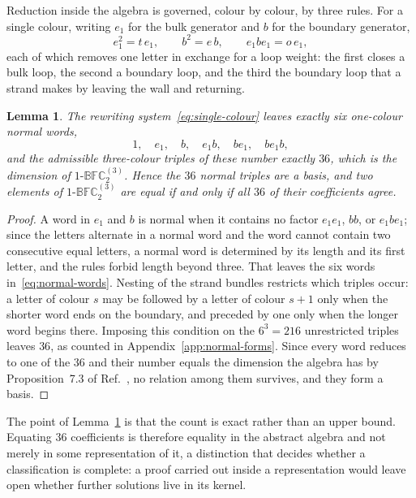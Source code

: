 \documentclass[
  aps,pre,
  reprint,
  superscriptaddress,
  amsmath,amssymb,
  floatfix
]{revtex4-2}
\theoremstyle{plain}
\newtheorem{lemma}[theorem]{Lemma}
\theoremstyle{definition}
\theoremstyle{remark}
\newcommand{\BFCthree}{1\text{-}\mathbb{BFC}^{(3)}_2}
\begin{document}
Reduction inside the algebra is governed, colour by colour, by three rules. For
a single colour, writing $e_1$ for the bulk generator and $b$ for the boundary
generator,
\begin{equation}
  e_1^2=t\,e_1,\qquad b^2=e\,b,\qquad e_1be_1=o\,e_1 ,
  \label{eq:single-colour}
\end{equation}
each of which removes one letter in exchange for a loop weight: the first
closes a bulk loop, the second a boundary loop, and the third the boundary loop
that a strand makes by leaving the wall and returning.

\begin{lemma}
\label{lem:basis}
The rewriting system~\eqref{eq:single-colour} leaves exactly six one-colour
normal words,
\begin{equation}
  1,\quad e_1,\quad b,\quad e_1b,\quad be_1,\quad be_1b ,
  \label{eq:normal-words}
\end{equation}
and the admissible three-colour triples of these number exactly $36$, which is
the dimension of $\BFCthree$. Hence the $36$ normal triples are a basis, and
two elements of $\BFCthree$ are equal if and only if all $36$ of their
coefficients agree.
\end{lemma}

\begin{proof}
A word in $e_1$ and $b$ is normal when it contains no factor $e_1e_1$, $bb$, or
$e_1be_1$; since the letters alternate in a normal word and the word cannot
contain two consecutive equal letters, a normal word is determined by its
length and its first letter, and the rules forbid length beyond three. That
leaves the six words in~\eqref{eq:normal-words}. Nesting of the strand bundles
restricts which triples occur: a letter of colour $s$ may be followed by a
letter of colour $s+1$ only when the shorter word ends on the boundary, and
preceded by one only when the longer word begins there. Imposing this condition
on the $6^3=216$ unrestricted triples leaves $36$, as counted in
Appendix~\ref{app:normal-forms}. Since every word reduces to one of the $36$
and their number equals the dimension the algebra has by Proposition~7.3 of
Ref.~\cite{shigechi2025fuss}, no relation among them survives, and they form a
basis.
\end{proof}

The point of Lemma~\ref{lem:basis} is that the count is exact rather than an
upper bound. Equating $36$ coefficients is therefore equality in the abstract
algebra and not merely in some representation of it, a distinction that decides
whether a classification is complete: a proof carried out inside a
representation would leave open whether further solutions live in its kernel.
\end{document}
